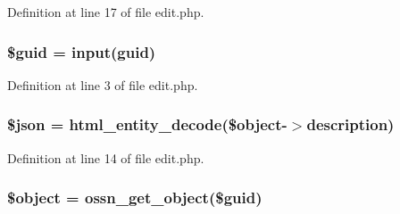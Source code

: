 Definition at line 17 of file edit.\+php.

\subsubsection[{\texorpdfstring{\$guid}{$guid}}]{\setlength{\rightskip}{0pt plus 5cm}\$guid = {\bf input}(\textquotesingle{}guid\textquotesingle{})}\hypertarget{components_2_ossn_wall_2actions_2wall_2post_2edit_8php_af99126304cbcb2e1483892c40bb3aae4}{}\label{components_2_ossn_wall_2actions_2wall_2post_2edit_8php_af99126304cbcb2e1483892c40bb3aae4}


Definition at line 3 of file edit.\+php.

\subsubsection[{\texorpdfstring{\$json}{$json}}]{\setlength{\rightskip}{0pt plus 5cm}\$json = html\+\_\+entity\+\_\+decode(\$object-\/$>${\bf description})}\hypertarget{components_2_ossn_wall_2actions_2wall_2post_2edit_8php_acedd13b51401130848ce18f4d5c52605}{}\label{components_2_ossn_wall_2actions_2wall_2post_2edit_8php_acedd13b51401130848ce18f4d5c52605}


Definition at line 14 of file edit.\+php.

\subsubsection[{\texorpdfstring{\$object}{$object}}]{\setlength{\rightskip}{0pt plus 5cm}\$object = {\bf ossn\+\_\+get\+\_\+object}(\$guid)}\hypertarget{components_2_ossn_wall_2actions_2wall_2post_2edit_8php_a52123b83a1952a68c5513e47d59ec4a6}{}\label{components_2_ossn_wall_2actions_2wall_2post_2edit_8php_a52123b83a1952a68c5513e47d59ec4a6}


